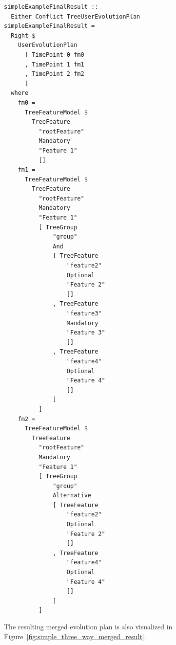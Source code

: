 \documentclass[a4paper,english]{ifimaster}
\begin{document}
\begin{verbatim}
simpleExampleFinalResult ::
  Either Conflict TreeUserEvolutionPlan
simpleExampleFinalResult =
  Right $
    UserEvolutionPlan
      [ TimePoint 0 fm0
      , TimePoint 1 fm1
      , TimePoint 2 fm2
      ]
  where
    fm0 =
      TreeFeatureModel $
        TreeFeature
          "rootFeature"
          Mandatory
          "Feature 1"
          []
    fm1 =
      TreeFeatureModel $
        TreeFeature
          "rootFeature"
          Mandatory
          "Feature 1"
          [ TreeGroup
              "group"
              And
              [ TreeFeature
                  "feature2"
                  Optional
                  "Feature 2"
                  []
              , TreeFeature
                  "feature3"
                  Mandatory
                  "Feature 3"
                  []
              , TreeFeature
                  "feature4"
                  Optional
                  "Feature 4"
                  []
              ]
          ]
    fm2 =
      TreeFeatureModel $
        TreeFeature
          "rootFeature"
          Mandatory
          "Feature 1"
          [ TreeGroup
              "group"
              Alternative
              [ TreeFeature
                  "feature2"
                  Optional
                  "Feature 2"
                  []
              , TreeFeature
                  "feature4"
                  Optional
                  "Feature 4"
                  []
              ]
          ]
\end{verbatim}

The resulting merged evolution plan is also visualized in Figure~\ref{fig:simple_three_way_merged_result}.
\end{document}
